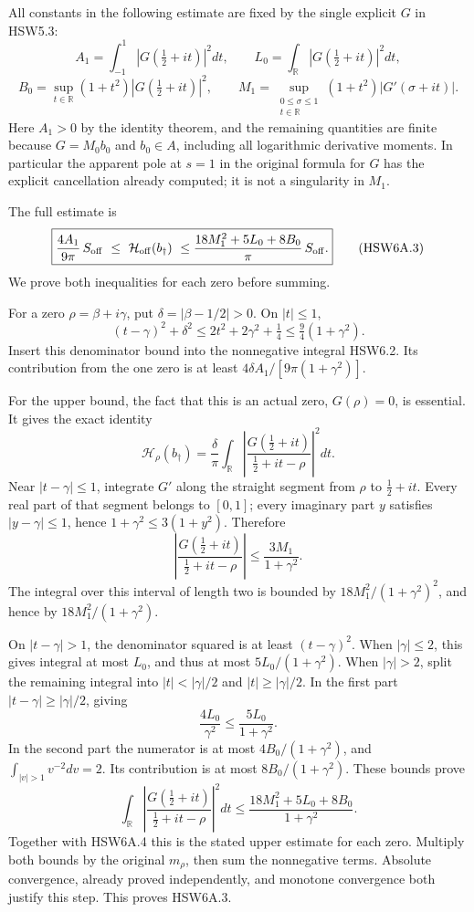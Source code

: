 All constants in the following estimate are fixed by the single explicit
\(G\) in HSW5.3: \[
A_1=\int_{-1}^1|G(\tfrac12+it)|^2dt,\qquad
L_0=\int_{\mathbb R}|G(\tfrac12+it)|^2dt,
\] \[
B_0=\sup_{t\in\mathbb R}(1+t^2)|G(\tfrac12+it)|^2,\qquad
M_1=\sup_{\substack{0\le\sigma\le1\\t\in\mathbb R}}
 (1+t^2)|G'(\sigma+it)|.
\tag{HSW6A.2}
\] Here \(A_1>0\) by the identity theorem, and the remaining quantities
are finite because \(G=M_0b_0\) and \(b_0\in A\), including all
logarithmic derivative moments. In particular the apparent pole at
\(s=1\) in the original formula for \(G\) has the explicit cancellation
already computed; it is not a singularity in \(M_1\).

The full estimate is \[
\boxed{
\frac{4A_1}{9\pi}\,S_{\rm off}
\ \le\ \mathcal H_{\rm off}(b_\dagger)\
\le\frac{18M_1^2+5L_0+8B_0}{\pi}\,S_{\rm off}.}
\tag{HSW6A.3}
\] We prove both inequalities for each zero before summing.

For a zero \(\rho=\beta+i\gamma\), put \(\delta=|\beta-1/2|>0\). On
\(|t|\le1\), \[
(t-\gamma)^2+\delta^2
\le2t^2+2\gamma^2+\tfrac14
\le\tfrac94(1+\gamma^2).
\] Insert this denominator bound into the nonnegative integral HSW6.2.
Its contribution from the one zero is at least
\(4\delta A_1/[9\pi(1+\gamma^2)]\).

For the upper bound, the fact that this is an actual zero,
\(G(\rho)=0\), is essential. It gives the exact identity \[
\mathcal H_\rho(b_\dagger)
=\frac{\delta}{\pi}
 \int_{\mathbb R}\left|
 \frac{G(\tfrac12+it)}{\tfrac12+it-\rho}\right|^2dt.
\tag{HSW6A.4}
\] Near \(|t-\gamma|\le1\), integrate \(G'\) along the straight segment
from \(\rho\) to \(\tfrac12+it\). Every real part of that segment
belongs to \([0,1]\); every imaginary part \(y\) satisfies
\(|y-\gamma|\le1\), hence \(1+\gamma^2\le3(1+y^2)\). Therefore \[
\left|\frac{G(\tfrac12+it)}{\tfrac12+it-\rho}\right|
\le\frac{3M_1}{1+\gamma^2}.
\] The integral over this interval of length two is bounded by
\(18M_1^2/(1+\gamma^2)^2\), and hence by \(18M_1^2/(1+\gamma^2)\).

On \(|t-\gamma|>1\), the denominator squared is at least
\((t-\gamma)^2\). When \(|\gamma|\le2\), this gives integral at most
\(L_0\), and thus at most \(5L_0/(1+\gamma^2)\). When \(|\gamma|>2\),
split the remaining integral into \(|t|<|\gamma|/2\) and
\(|t|\ge|\gamma|/2\). In the first part \(|t-\gamma|\ge|\gamma|/2\),
giving \[
\frac{4L_0}{\gamma^2}\le\frac{5L_0}{1+\gamma^2}.
\] In the second part the numerator is at most \(4B_0/(1+\gamma^2)\),
and \(\int_{|v|>1}v^{-2}dv=2\). Its contribution is at most
\(8B_0/(1+\gamma^2)\). These bounds prove \[
\int_{\mathbb R}\left|
 \frac{G(\tfrac12+it)}{\tfrac12+it-\rho}\right|^2dt
\le\frac{18M_1^2+5L_0+8B_0}{1+\gamma^2}.
\] Together with HSW6A.4 this is the stated upper estimate for each
zero. Multiply both bounds by the original \(m_\rho\), then sum the
nonnegative terms. Absolute convergence, already proved independently,
and monotone convergence both justify this step. This proves HSW6A.3.

